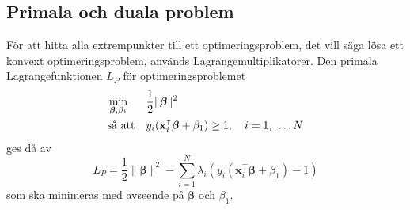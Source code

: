 \documentclass[a4paper, 12pt]{report}
\theoremstyle{definition}
\theoremstyle{remark}
\newcommand{\bfbeta}{{\boldsymbol{\beta}}}
\begin{document}
\subsection{Primala och duala problem}

För att hitta alla extrempunkter till ett optimeringsproblem, det vill säga lösa ett konvext optimeringsproblem, används Lagrangemultiplikatorer.
Den primala Lagrangefunktionen $L_P$ för optimeringsproblemet
\begin{equation*}
\begin{aligned}
& \operatornamewithlimits{min}_{\bfbeta,\beta_1} & & \frac{1}{2}\|\bfbeta\|^2\\
& \text{så att} & & y_i(\mathbf{x}_i^\intercal\bfbeta+\beta_1)\geq 1,\quad i=1,\dots,N
\end{aligned}
\end{equation*}
ges då av
\begin{equation}\label{eq:primallagrange}
L_P=\frac{1}{2}\|\bfbeta\|^2 - \sum_{i=1}^{N} \lambda_i\left(y_i \left(\mathbf{x}_i^\intercal\bfbeta + \beta_1\right)-1\right)
\end{equation}
som ska minimeras med avseende på $\bfbeta$ och $\beta_1$.
\end{document}
